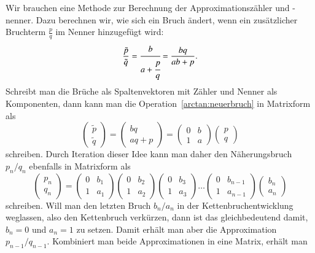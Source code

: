 \begin{refsection}
Wir brauchen eine Methode zur Berechnung der Approximationszähler und -nenner.
Dazu berechnen wir, wie sich ein Bruch ändert, wenn ein zusätzlicher
Bruchterm $\frac{p}{q}$ im Nenner hinzugefügt wird:
\begin{equation}
\frac{\tilde{p}}{\tilde{q}}
=
\cfrac{b}{a+\cfrac{p}{q}}
=
\frac{bq}{ab+p}.
\label{arctan:neuerbruch}
\end{equation}
Schreibt man die Brüche als Spaltenvektoren mit Zähler und Nenner als
Komponenten, dann kann man die Operation~\eqref{arctan:neuerbruch}
in Matrixform als
\[
\begin{pmatrix}
\tilde{p}\\\tilde{q}
\end{pmatrix}
=
\begin{pmatrix}
bq\\
aq+p
\end{pmatrix}
=
\begin{pmatrix}
0&b\\
1&a
\end{pmatrix}
\begin{pmatrix}
p\\
q
\end{pmatrix}
\]
schreiben.
Durch Iteration dieser Idee kann man daher den Näherungsbruch $p_n/q_n$
ebenfalls in Matrixform als
\[
\begin{pmatrix}
p_n\\q_n
\end{pmatrix}
=
\begin{pmatrix} 0&b_1\\1&a_1\end{pmatrix}
\begin{pmatrix} 0&b_2\\1&a_2\end{pmatrix}
\begin{pmatrix} 0&b_3\\1&a_3\end{pmatrix}
\dots
\begin{pmatrix} 0&b_{n-1}\\1&a_{n-1}\end{pmatrix}
\begin{pmatrix} b_n\\a_n\end{pmatrix}
\]
schreiben.
Will man den letzten Bruch $b_n/a_n$ in der Kettenbruchentwicklung
weglassen, also den Kettenbruch verkürzen, dann ist das gleichbedeutend
damit, $b_n=0$ und $a_n=1$ zu setzen.
Damit erhält man aber die Approximation $p_{n-1}/q_{n-1}$.
Kombiniert man beide Approximationen in eine Matrix, erhält man

\end{refsection}
